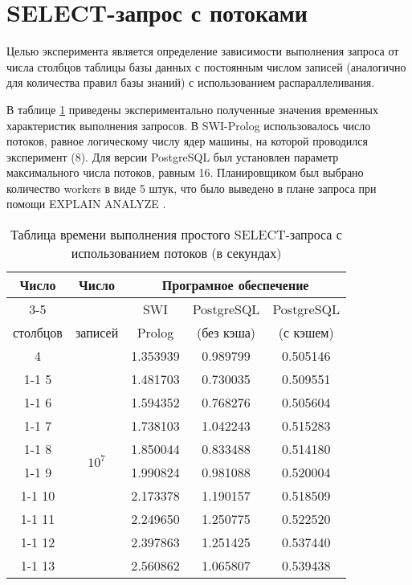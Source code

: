\section{SELECT-запрос с потоками}
\vspace{-0.5cm}
Целью эксперимента является определение зависимости выполнения запроса от числа столбцов таблицы базы данных с постоянным числом записей (аналогично для количества правил базы знаний) с использованием распараллеливания. 

В таблице \ref{table:exper_3} приведены экспериментально полученные значения временных характеристик выполнения запросов. В SWI-Prolog использовалось число потоков, равное логическому числу ядер машины, на которой проводился эксперимент (8). Для версии PostgreSQL был установлен параметр максимального числа потоков, равным 16. Планировщиком был выбрано количество workers в виде 5 штук, что было выведено в плане запроса при помощи EXPLAIN ANALYZE \cite{explain_analyze}. 

\begin{table}[ht!]
	\centering
	\captionsetup{singlelinecheck = false, justification=raggedright}
	\caption{Таблица времени выполнения простого SELECT-запроса с использованием потоков (в секундах)}
	\label{table:exper_3}
	\begin{tabular}{|c|c|c|c|c|}
		\hline
		\multirow{3}{*}{Число} & \multirow{3}{*}{Число} & \multicolumn{3}{c|}{Програмное обеспечение} \\ \cline{3-5}
		& & SWI & PostgreSQL & PostgreSQL \\
		столбцов & записей & Prolog & (без кэша) & (с кэшем)\\ \hline
		4 & \multirow{10}{*}{$10^7$} & 1.353939 & 0.989799 & 0.505146  \\ \cline{1-1} \cline{3-5}
		5 &   &	1.481703 & 0.730035 & 0.509551  \\ \cline{1-1} \cline{3-5}
		6 &   &	1.594352 & 0.768276 & 0.505604 \\ \cline{1-1} \cline{3-5}
		7 &   &	1.738103 & 1.042243 & 0.515283 \\ \cline{1-1} \cline{3-5}
		8 &   &	1.850044 & 0.833488 & 0.514180 \\ \cline{1-1} \cline{3-5}
		9 &   & 1.990824 & 0.981088 & 0.520004 \\ \cline{1-1} \cline{3-5}
		10 &  & 2.173378 & 1.190157 & 0.518509 \\ \cline{1-1} \cline{3-5}
		11 &  & 2.249650 & 1.250775 & 0.522520 \\ \cline{1-1} \cline{3-5}
		12 &  & 2.397863 & 1.251425 & 0.537440 \\ \cline{1-1} \cline{3-5}
		13 &  &	2.560862 & 1.065807 & 0.539438 \\ \hline
	\end{tabular}
\end{table} 

